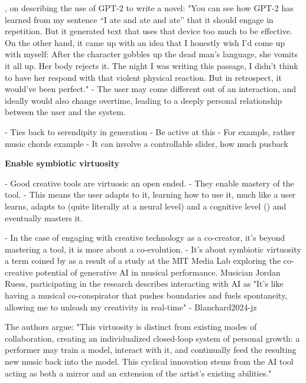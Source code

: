     \cite{Samuel2019-gc}, on describing the use of GPT-2 to write a novel: 
       "You can see how GPT-2 has learned from my sentence “I ate and ate and ate” that it should engage in repetition. But it generated text that uses that device too much to be effective. On the other hand, it came up with an idea that I honestly wish I’d come up with myself: After the character gobbles up the dead man’s language, she vomits it all up. Her body rejects it. The night I was writing this passage, I didn’t think to have her respond with that violent physical reaction. But in retrospect, it would’ve been perfect."
    - The user may come different out of an interaction, and ideally would also change overtime, leading to a deeply personal relationship between the user and the system. 


    - Ties back to serendipity in generation
    - Be active at this
    - For example, rather music chords example
    - It can involve a controllable slider, how much pusback 

\item \textbf{Enable symbiotic virtuosity}

- Good creative tools are virtuosic an open ended. 
- They enable mastery of the tool. 
- This means the user adapts to it, learning how to use it, much like a user learns, adapts to (quite literally at a neural level\cite{Pascual-Leone2001-lh}) and a cognitive level (\cite{Clark1998-yi, Malafouris2013-by}) and eventually masters it. 

- In the case of engaging with creative technology as a co-creator, it's beyond mastering a tool, it is more about a co-evolution. 
- It's about symbiotic virtuosity a term coined by \cite{Blanchard2024-jz} as a result of a study at the MIT Media Lab exploring the co-creative potential of generative AI in musical performance. Musician Jordan Ruess, participating in the research describes interacting with AI as "It's like having a musical co-conspirator that pushes boundaries and fuels spontaneity, allowing me to unleash my creativity in real-time" 
 - { Blanchard2024-jz}

 The authors argue: "This virtuosity is distinct from existing modes of collaboration, creating an individualized closed-loop system of personal growth: a performer may train a model, interact with it, and continually feed the resulting new music back into the model. This cyclical innovation stems from the AI tool acting as both a mirror and an extension of the artist’s existing abilities."

